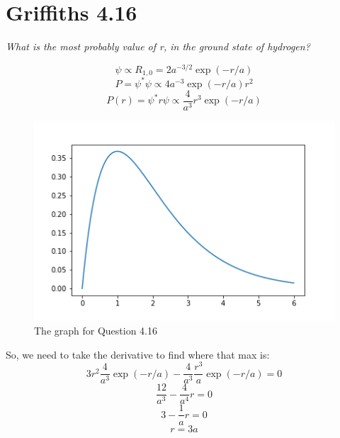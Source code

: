 \documentclass[12pt]{article}
\begin{document}
\newpage

\section*{Griffiths 4.16}
{\sl What is the most probably value of r, in the ground state of hydrogen?}

\[\psi \propto R_{1,0} = 2a^{-3/2}\exp(-r/a)\]
\[P = \psi^* \psi \propto 4a^{-3} \exp(-r/a)r^2\]
\[P(r) = \psi^* r \psi \propto \frac{4}{a^3}r^3 \exp(-r/a)\]
\begin{figure}[!ht]
\centering
\includegraphics[scale=.75]{hw11_3.png}
\caption{The graph for Question 4.16}
\end{figure}
So, we need to take the derivative to find where that max is:
\[3r^2 \frac{4}{a^3}\exp(-r/a) - \frac{4}{a^3}\frac{r^3}{a} \exp(-r/a) = 0\]
\[\frac{12}{a^3} - \frac{4}{a^4}r = 0\]
\[3 -\frac{1}{a}r = 0\]
\[\boxed{r = 3a}\]

\newpage
\end{document}
